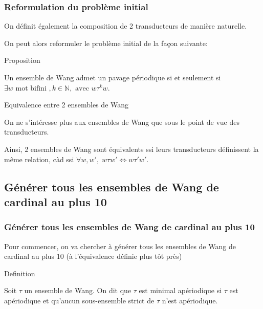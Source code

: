 \documentclass{beamer}
\newcommand{\N}{\mathbb N}
\begin{document}
\begin{frame}
\frametitle{Reformulation du problème initial}

On définit également la composition de 2 transducteurs de manière naturelle.

On peut alors reformuler le problème initial de la façon suivante:

\begin{block}{Proposition}

Un ensemble de Wang admet un pavage périodique si et seulement si $\exists w \text{ mot bifini }, k \in \N, \text{ avec } w \tau^k w$.
    
\end{block}

\begin{block}{Equivalence entre 2 ensembles de Wang}

On ne s'intéresse plus aux ensembles de Wang que sous le point de vue des transducteurs.

Ainsi, 2 ensembles de Wang sont équivalents ssi leurs transducteurs définissent la même relation, càd ssi $\forall w,w', \; w \tau w' \iff w \tau' w'$.
    
\end{block}

\end{frame}

\subsection{Générer tous les ensembles de Wang de cardinal au plus 10}

\begin{frame}

\frametitle{Générer tous les ensembles de Wang de cardinal au plus 10}

Pour commencer, on va chercher à générer tous les ensembles de Wang de cardinal au plus 10 (à l'équivalence définie plus tôt près)

\begin{alertblock}{Definition}

Soit $\tau$ un ensemble de Wang. On dit que $\tau$ est minimal apériodique si $\tau$ est apériodique
et qu'aucun sous-ensemble strict de $\tau$ n'est apériodique.
    
\end{alertblock}
    
\end{frame}
\end{document}
